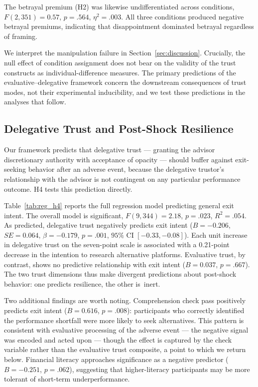 

The betrayal premium (H2) was likewise undifferentiated across conditions, $F(2, 351) = 0.57$, $p = .564$, $\eta^2 = .003$. All three conditions produced negative betrayal premiums, indicating that disappointment dominated betrayal regardless of framing.

We interpret the manipulation failure in Section~\ref{sec:discussion}. Crucially, the null effect of condition assignment does not bear on the validity of the trust constructs as individual-difference measures. The primary predictions of the evaluative--delegative framework concern the downstream consequences of trust modes, not their experimental inducibility, and we test these predictions in the analyses that follow.

\subsection{Delegative Trust and Post-Shock Resilience}

Our framework predicts that delegative trust --- granting the advisor discretionary authority with acceptance of opacity --- should buffer against exit-seeking behavior after an adverse event, because the delegative trustor's relationship with the advisor is not contingent on any particular performance outcome. H4 tests this prediction directly.

Table~\ref{tab:reg_h4} reports the full regression model predicting general exit intent. The overall model is significant, $F(9, 344) = 2.18$, $p = .023$, $R^2 = .054$. As predicted, delegative trust negatively predicts exit intent ($B = -0.206$, $SE = 0.064$, $\beta = -0.179$, $p = .001$, $95\%$ CI $[-0.33, -0.08]$). Each unit increase in delegative trust on the seven-point scale is associated with a 0.21-point decrease in the intention to research alternative platforms. Evaluative trust, by contrast, shows no predictive relationship with exit intent ($B = 0.037$, $p = .667$). The two trust dimensions thus make divergent predictions about post-shock behavior: one predicts resilience, the other is~inert.



Two additional findings are worth noting. Comprehension check pass positively predicts exit intent ($B = 0.616$, $p = .008$): participants who correctly identified the performance shortfall were more likely to seek alternatives. This pattern is consistent with evaluative processing of the adverse event --- the negative signal was encoded and acted upon --- though the effect is captured by the check variable rather than the evaluative trust composite, a point to which we return below. Financial literacy approaches significance as a negative predictor ($B = -0.251$, $p = .062$), suggesting that higher-literacy participants may be more tolerant of short-term underperformance.


